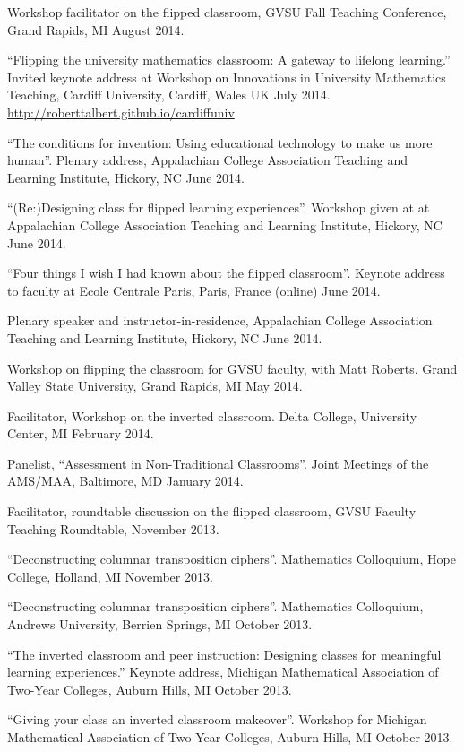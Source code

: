 \documentclass[letterpaper]{article}
\renewenvironment{itemize}{
  \begin{list}{}{
    \setlength{\leftmargin}{1.5em}
	\setlength{\itemsep}{0in}
  }
}{
  \end{list}
}
\begin{document}
\begin{itemize}
	\item Workshop facilitator on the flipped classroom, GVSU Fall Teaching Conference, Grand Rapids, MI August 2014.
	\item ``Flipping the university mathematics classroom: A gateway to lifelong learning.'' Invited keynote address at Workshop on Innovations in University Mathematics Teaching, Cardiff University, Cardiff, Wales UK July 2014. \url{http://roberttalbert.github.io/cardiffuniv}
	\item ``The conditions for invention: Using educational technology to make us more human''. Plenary address, Appalachian College Association Teaching and Learning Institute, Hickory, NC June 2014.
	\item ``(Re:)Designing class for flipped learning experiences''.  Workshop given at at Appalachian College Association Teaching and Learning Institute, Hickory, NC June 2014.
	\item ``Four things I wish I had known about the flipped classroom''. Keynote address to faculty at Ecole Centrale Paris, Paris, France (online) June 2014.
	\item Plenary speaker and instructor-in-residence, Appalachian College Association Teaching and Learning Institute, Hickory, NC June 2014.
	\item Workshop on flipping the classroom for GVSU faculty, with Matt Roberts. Grand Valley State University, Grand Rapids, MI May 2014.
	\item Facilitator, Workshop on the inverted classroom. Delta College, University Center, MI February 2014.
	\item Panelist, ``Assessment in Non-Traditional Classrooms''. Joint Meetings of the AMS/MAA, Baltimore, MD January 2014.
	\item Facilitator, roundtable discussion on the flipped classroom, GVSU Faculty Teaching Roundtable, November 2013.
	\item ``Deconstructing columnar transposition ciphers''. Mathematics Colloquium, Hope College, Holland, MI November 2013.
	\item ``Deconstructing columnar transposition ciphers''. Mathematics Colloquium, Andrews University, Berrien Springs, MI October 2013.
	\item ``The inverted classroom and peer instruction: Designing classes for meaningful learning experiences.'' Keynote address, Michigan Mathematical Association of Two-Year Colleges, Auburn Hills, MI October 2013.
	\item ``Giving your class an inverted classroom makeover''. Workshop for Michigan Mathematical Association of Two-Year Colleges, Auburn Hills, MI October 2013.

\end{itemize}
\end{document}
